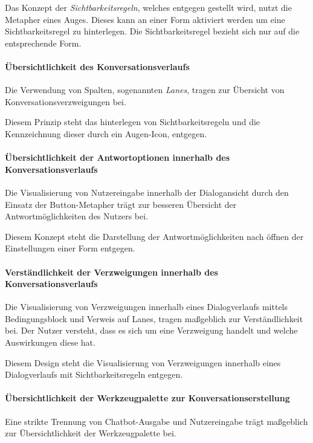 Das Konzept der \emph{Sichtbarkeitsregeln}, welches entgegen gestellt wird, nutzt die Metapher eines Auges. Dieses kann an einer Form aktiviert werden um eine Sichtbarkeitsregel zu hinterlegen. Die Sichtbarkeitsregel bezieht sich nur auf die entsprechende Form. 

\paragraph{Übersichtlichkeit des Konversationsverlaufs}
Die Verwendung von Spalten, sogenannten \emph{Lanes}, tragen zur Übersicht von Konversationsverzweigungen bei.

Diesem Prinzip steht das hinterlegen von Sichtbarkeitsregeln und die Kennzeichnung dieser durch ein Augen-Icon, entgegen.

\paragraph{Übersichtlichkeit der Antwortoptionen innerhalb des Konversationsverlaufs}
Die Visualisierung von Nutzereingabe innerhalb der Dialogansicht durch den Einsatz der Button-Metapher trägt zur besseren Übersicht der Antwortmöglichkeiten des Nutzers bei.

Diesem Konzept steht die Darstellung der Antwortmöglichkeiten nach öffnen der Einstellungen einer Form entgegen.


\paragraph{Verständlichkeit der Verzweigungen innerhalb des Konversationsverlaufs}
Die Visualisierung von Verzweigungen innerhalb eines Dialogverlaufs mittels Bedingungsblock und Verweis auf Lanes, tragen maßgeblich zur Verständlichkeit bei. Der Nutzer versteht, dass es sich um eine Verzweigung handelt und welche Auswirkungen diese hat. 

Diesem Design steht die Visualisierung von Verzweigungen innerhalb eines Dialogverlaufs mit Sichtbarkeitsregeln entgegen.



\paragraph{Übersichtlichkeit der Werkzeugpalette zur Konversationserstellung}
Eine strikte Trennung von Chatbot-Ausgabe und Nutzereingabe trägt maßgeblich zur Übersichtlichkeit der Werkzeugpalette bei. 

